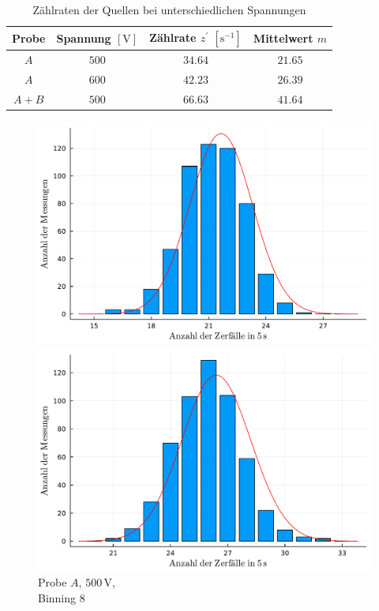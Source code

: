 \documentclass[12pt,a4paper]{scrartcl}
\numberwithin{equation}{section} %
\begin{document}
\begin{table}[h!]
	\centering
	\begin{tabular}{c|c|c|c}
		Probe
			& Spannung $[\mathrm V]$
			& Zählrate $z^\prime$ $[\mathrm{s^{-1}}]$ &
			Mittelwert $m$ \\
		\hline
		$A$ & $500$ & $34.64$ & $21.65$ \\
		$A$ & $600$ & $42.23$ & $26.39$ \\
		$A+B$ & $500$ & $66.63$ & $41.64$ \\
	\end{tabular}
	\caption{Zählraten der Quellen bei unterschiedlichen Spannungen}
	\label{table:zählraten gauss}
\end{table}
\begin{figure}[h!]
	\centering
	\begin{minipage}{0.3\textwidth}
		\centering
		\includegraphics[width=\textwidth]{../media/B3.1/gauss1.pdf}
		\caption*{Probe $A$, $500 \mathrm{\, V}$,\\Binning $8$}
	\end{minipage}
	\begin{minipage}{0.3\textwidth}
		\centering
		\includegraphics[width=\textwidth]{../media/B3.1/gauss2.pdf}

\end{minipage}
\end{figure}
\end{document}
